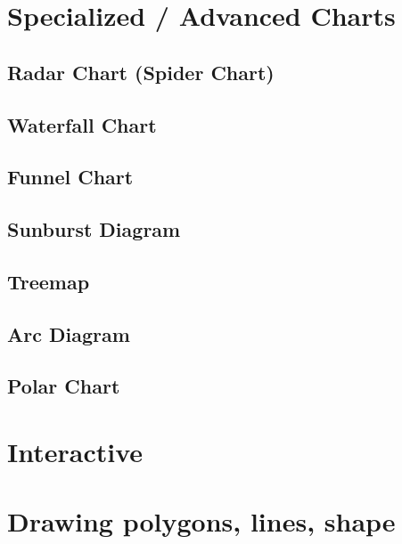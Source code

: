 \documentclass[
  letterpaper,
  DIV=11,
  numbers=noendperiod]{scrreprt}
\begin{document}
\section{Specialized / Advanced
Charts}\label{specialized-advanced-charts}

\subsection{Radar Chart (Spider Chart)}\label{radar-chart-spider-chart}

\subsection{Waterfall Chart}\label{waterfall-chart}

\subsection{Funnel Chart}\label{funnel-chart}

\subsection{Sunburst Diagram}\label{sunburst-diagram}

\subsection{Treemap}\label{treemap}

\subsection{Arc Diagram}\label{arc-diagram}

\subsection{Polar Chart}\label{polar-chart}

\section{Interactive}\label{interactive}

\section{Drawing polygons, lines,
shape}\label{drawing-polygons-lines-shape}

\end{document}
